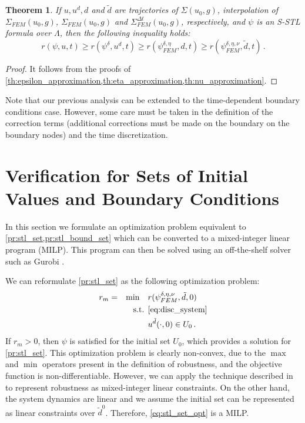 \documentclass[letterpaper, 10 pt, conference]{ieeeconf/ieeeconf}
\newtheorem{theorem}{Theorem}
\begin{document}
\begin{theorem}
    \label{th:robustness}
    If $u, u^d, d$ and $\tilde{d}$ are trajectories of $\Sigma(u_0, g)$, interpolation
    of $\Sigma_{FEM}(u_0, g)$, $\Sigma_{FEM}(u_0, g)$ and $\Sigma_{FEM}^{\Delta t}(u_0, g)$,
    respectively, and $\psi$ is an S-STL formula over $\Lambda$, then the 
    following inequality holds:
    \begin{equation}
        r(\psi, u, t) \geq r(\psi^{\delta}, u^d, t) \geq r(\psi^{\delta,
        \eta}_{FEM}, d, t) \geq r(\psi^{\delta, \eta, \nu}_{FEM}, \tilde{d}, t)
        \,.
    \end{equation}
\end{theorem}
\begin{proof}
    It follows from the proofs of
    \cref{th:epsilon_approximation,th:eta_approximation,th:nu_approximation}.
\end{proof}

Note that our previous analysis can be extended to the time-dependent
boundary conditions case. However, some care must be taken in the
definition of the correction terms (additional corrections must be made on the
boundary on the boundary nodes) and the time discretization.

\section{Verification for Sets of Initial Values and Boundary Conditions}
\label{sec:verification_of_initial_sets}

In this section we formulate an optimization problem equivalent to
\cref{pr:stl_set,pr:stl_bound_set} which can be converted to a mixed-integer linear program
(MILP). This program can then be solved using an off-the-shelf solver such 
as Gurobi \cite{gurobi}.

We can reformulate \cref{pr:stl_set} as the following optimization problem:
%
\begin{equation}
    \label{eq:stl_set_opt}
    \begin{aligned}
        &r_m = &\min \quad &r(\psi^{\delta, \eta, \nu}_{FEM}, \tilde{d}, 0) \\
        &  &\text{s.t. } &\cref{eq:disc_system} \\
        &  & &u^{\tilde{d}}(\cdot, 0) \in U_0 \,.
    \end{aligned}
\end{equation}
%
If $r_m > 0$, then $\psi$ is satisfied for the initial set $U_0$, which provides
a solution for \cref{pr:stl_set}. This
optimization problem is clearly non-convex, due to the $\max$ and $\min$
operators present in the definition of robustness, and the objective function is
non-differentiable. However, we can apply the technique described in
\cite{sadraddini_robust_2015} to
represent robustness as mixed-integer linear constraints. On the other hand, the
system dynamics are linear and we assume the initial set can be represented as
linear constraints over $\tilde{d}^0$. Therefore, \cref{eq:stl_set_opt} is a
MILP.
\end{document}
